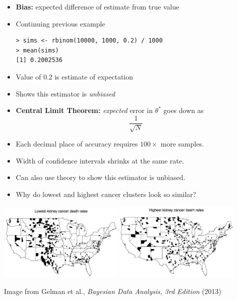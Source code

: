 \documentclass[10pt]{report}
\begin{document}
\begin{itemize}
\item {\bfseries Bias:} expected difference of estimate from true value
\item Continuing previous example
{\small
\begin{Verbatim}
> sims <- rbinom(10000, 1000, 0.2) / 1000
> mean(sims)
[1] 0.2002536
\end{Verbatim}
}
\item Value of 0.2 is estimate of expectation
\item Shows this estimator is \emph{unbiased}
\end{itemize}

\begin{itemize}
\item {\bfseries Central Limit Theorem:}  \emph{expected} error in $\theta^*$ goes down as
{\Large
\[
\frac{1}{\sqrt{N}}
\]
}
\item Each decimal place of accuracy requires $100 \times$ more samples.
\item Width of confidence intervals shrinks at the same rate.
\vfill
\item Can also use theory to show this estimator is unbiased.
\end{itemize}

%
\begin{itemize}
\item Why do lowest and highest cancer clusters look so similar?
\end{itemize}
\vspace*{1pt}
\begin{center}
\hfill
\includegraphics[width=0.45\textwidth]{img/low-cancer.jpg}
\hfill
\includegraphics[width=0.45\textwidth]{img/high-cancer.jpg}
\hfill
\end{center}
\vfill
\hfill {\tiny Image from Gelman et al., {\slshape Bayesian Data Analysis, 3rd Edition} (2013)}
\end{document}
